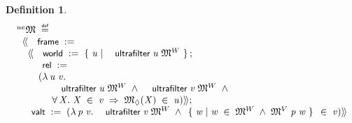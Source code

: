 \documentclass{llncs}
\newtheorem{defn}{Definition}[chapter]
\newenvironment{holmath}{\begin{displaymath}\begin{array}{l}}{\end{array}\end{displaymath}\ignorespacesafterend}
\renewcommand{\HOLConst}[1]{{\textsf{\upshape\small #1}}}
\renewcommand{\HOLFieldName}[1]{\HOLConst{#1}}
\renewcommand{\HOLTokenLeftrec}{\ensuremath{\langle\!\langle}}
\renewcommand{\HOLTokenRightrec}{\ensuremath{\rangle\!\rangle}}
\renewcommand{\HOLTokenBar}{\mbox{$|$}}
\begin{document}
\begin{defn}
{\upshape\cite[Definition 2.57 (Ultrafilter Extension)]{Blackburn}}
\begin{holmath}
  {}\sp{ue}{\HOLFreeVar{\ensuremath{\mathfrak{M}}}}\;\HOLTokenDefEquality{}\\
\;\;\HOLTokenLeftrec{}\HOLFieldName{frame}\;:=\\
\;\;\;\;\HOLTokenLeftrec{}\HOLFieldName{world}\;:=\;\HOLTokenLeftbrace{}\HOLBoundVar{u}\;\HOLTokenBar{}\;\HOLConst{ultrafilter}\;\HOLBoundVar{u}\;\HOLFreeVar{\ensuremath{\mathfrak{M}}}\HOLSymConst{\ensuremath{\sp{W}}}\HOLTokenRightbrace{};\\
\;\;\;\;\;\;\HOLFieldName{rel}\;:=\\
\;\;\;\;\;\;\;\;(\HOLTokenLambda{}\HOLBoundVar{u}\;\HOLBoundVar{v}.\\
\;\;\;\;\;\;\;\;\;\;\;\;\;\HOLConst{ultrafilter}\;\HOLBoundVar{u}\;\HOLFreeVar{\ensuremath{\mathfrak{M}}}\HOLSymConst{\ensuremath{\sp{W}}}\;\HOLSymConst{\HOLTokenConj{}}\;\HOLConst{ultrafilter}\;\HOLBoundVar{v}\;\HOLFreeVar{\ensuremath{\mathfrak{M}}}\HOLSymConst{\ensuremath{\sp{W}}}\;\HOLSymConst{\HOLTokenConj{}}\\
\;\;\;\;\;\;\;\;\;\;\;\;\;\HOLSymConst{\HOLTokenForall{}}\HOLBoundVar{X}.\;\HOLBoundVar{X}\;\HOLSymConst{\HOLTokenIn{}}\;\HOLBoundVar{v}\;\HOLSymConst{\HOLTokenImp{}}\;{\HOLFreeVar{\ensuremath{\mathfrak{M}}}}\sb{\Diamond}(\HOLBoundVar{X})\;\HOLSymConst{\HOLTokenIn{}}\;\HOLBoundVar{u})\HOLTokenRightrec{};\\
\;\;\HOLFieldName{valt}\;:=\;(\HOLTokenLambda{}\HOLBoundVar{p}\;\HOLBoundVar{v}.\;\HOLConst{ultrafilter}\;\HOLBoundVar{v}\;\HOLFreeVar{\ensuremath{\mathfrak{M}}}\HOLSymConst{\ensuremath{\sp{W}}}\;\HOLSymConst{\HOLTokenConj{}}\;\HOLTokenLeftbrace{}\HOLBoundVar{w}\;\HOLTokenBar{}\;\HOLBoundVar{w}\;\HOLSymConst{\HOLTokenIn{}}\;\HOLFreeVar{\ensuremath{\mathfrak{M}}}\HOLSymConst{\ensuremath{\sp{W}}}\;\HOLSymConst{\HOLTokenConj{}}\;\HOLFreeVar{\ensuremath{\mathfrak{M}}}\HOLSymConst{\ensuremath{\sp{V}}}\;\HOLBoundVar{p}\;\HOLBoundVar{w}\HOLTokenRightbrace{}\;\HOLSymConst{\HOLTokenIn{}}\;\HOLBoundVar{v})\HOLTokenRightrec{}
\end{holmath}
\end{defn}
\end{document}
